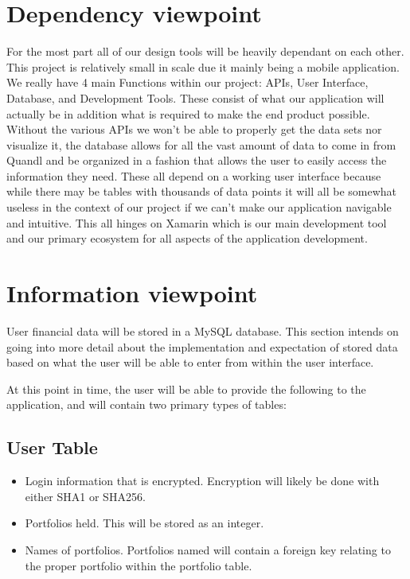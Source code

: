 \documentclass[onecolumn, draftclsnofoot,10pt, compsoc]{IEEEtran}
\begin{document}
\section{Dependency viewpoint}
      For the most part all of our design tools will be heavily dependant on each other. This project is relatively small in scale due it mainly being a mobile application. We really have 4 main Functions within our project: APIs, User Interface, Database, and Development Tools. These consist of what our application will actually be in addition what is required to make the end product possible. Without the various APIs we won't be able to properly get the data sets nor visualize it, the database allows for all the vast amount of data to come in from Quandl and be organized in a fashion that allows the user to easily access the information they need. These all depend on a working user interface because while there may be tables with thousands of data points it will all be somewhat useless in the context of our project if we can't make our application navigable and intuitive. This all hinges on Xamarin which is our main development tool and our primary ecosystem for all aspects of the application development. 
\section{Information viewpoint}
        User financial data will be stored in a MySQL database. This section intends on going into more detail
        about the implementation and expectation of stored
        data based on what the user will be able to enter from within the user interface.

        At this point in time, the user will be able to provide the following to the application, and will contain two primary types of tables:

\subsection{User Table}
\begin{itemize}
    \item Login information that is encrypted. Encryption will likely be done with either SHA1 or SHA256.
    \item Portfolios held. This will be stored as an integer.
    \item Names of portfolios. Portfolios named will contain a foreign key relating to the proper portfolio within the portfolio table.
\end{itemize}
\end{document}
